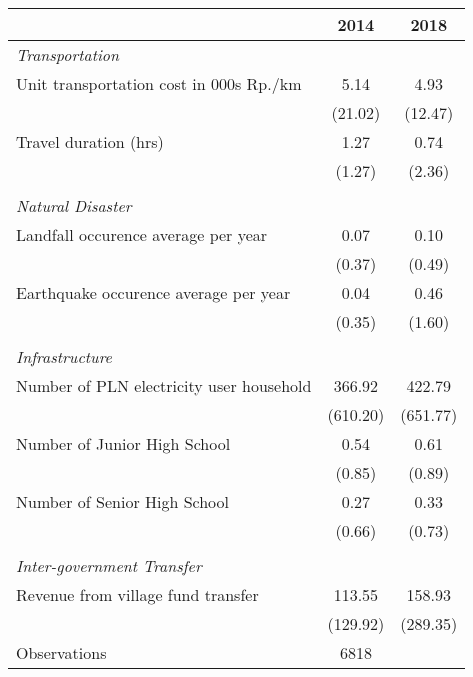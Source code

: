 \begin{tabular}{l*{2}{c}}
\hline\hline
                    &        2014&        2018\\
\hline
\emph{Transportation}&            &            \\
\hspace{0.25cm} Unit transportation cost in 000s Rp./km&        5.14&        4.93\\
                    &     (21.02)&     (12.47)\\
\hspace{0.25cm} Travel duration (hrs)&        1.27&        0.74\\
                    &      (1.27)&      (2.36)\\
\vspace{0.05em} \\ \emph{Natural Disaster}&            &            \\
\hspace{0.25cm} Landfall occurence average per year&        0.07&        0.10\\
                    &      (0.37)&      (0.49)\\
\hspace{0.25cm} Earthquake occurence average per year&        0.04&        0.46\\
                    &      (0.35)&      (1.60)\\
\vspace{0.05em} \\ \emph{Infrastructure}&            &            \\
\hspace{0.25cm} Number of PLN electricity user household&      366.92&      422.79\\
                    &    (610.20)&    (651.77)\\
\hspace{0.25cm} Number of Junior High School&        0.54&        0.61\\
                    &      (0.85)&      (0.89)\\
\hspace{0.25cm} Number of Senior High School&        0.27&        0.33\\
                    &      (0.66)&      (0.73)\\
\vspace{0.05em} \\ \emph{Inter-government Transfer}&            &            \\
\hspace{0.25cm} Revenue from village fund transfer&      113.55&      158.93\\
                    &    (129.92)&    (289.35)\\
\hline
Observations        &        6818&            \\
\hline\hline
\end{tabular}
